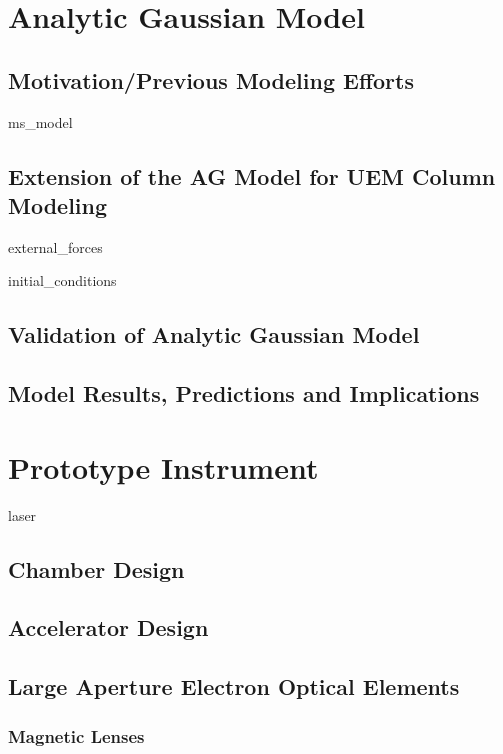 \documentclass{uicthesi}
\begin{document}
\chapter{Analytic Gaussian Model}

\section{Motivation/Previous Modeling Efforts}

{ms_model}

\section{Extension of the AG Model for UEM Column Modeling}

{external_forces}

{initial_conditions}

\section{Validation of Analytic Gaussian Model}

\section{Model Results, Predictions and Implications}

\chapter{Prototype Instrument}

{laser}

\section{Chamber Design}

\section{Accelerator Design}

\section{Large Aperture Electron Optical Elements}

\subsection{Magnetic Lenses}
\end{document}
